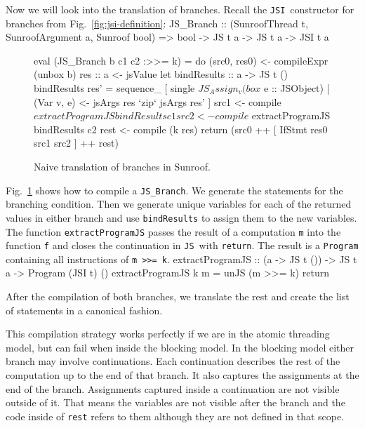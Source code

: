 \documentclass{llncs}
\newcommand{\Src}[1]{{\tt{#1}}}
\newcommand{\JS}{\Src{JS}}
\newcommand{\JSI}{\Src{JSI}}
\newenvironment{Code}{\verbatim}{\endverbatim}
\newcommand{\FigRef}[1]{Fig.~\ref{#1}}
\begin{document}
Now we will look into the translation of branches.
Recall the \JSI~constructor for branches from \FigRef{fig:jsi-definition}:
\begin{Code}
JS_Branch :: (SunroofThread t, SunroofArgument a, Sunroof bool) 
          => bool -> JS t a -> JS t a  -> JSI t a
\end{Code}
\begin{figure}[t]
\begin{Code}
eval (JS_Branch b c1 c2 :>>= k) = do
  (src0, res0) <- compileExpr (unbox b)
  res :: a <- jsValue
  let bindResults :: a -> JS t ()
      bindResults res' =
        sequence_ [ single $ JS_Assign_ v (box $ e :: JSObject)
                  | (Var v, e) <- jsArgs res `zip` jsArgs res' ]
  src1 <- compile $ extractProgramJS bindResults c1
  src2 <- compile $ extractProgramJS bindResults c2
  rest <- compile (k res)
  return (src0 ++ [ IfStmt res0 src1 src2 ] ++ rest)
\end{Code}
\caption{Naive translation of branches in Sunroof.}
\label{fig:branch-translation}
\end{figure}
\FigRef{fig:branch-translation} shows how to compile a \Src{JS\_Branch}.
We generate the statements for the branching condition.
Then we generate unique variables for each of the returned values in 
either branch and use \Src{bindResults} to assign them to the 
new variables. The function \Src{extractProgramJS} 
passes the result of a computation \Src{m} 
into the function \Src{f} and
closes the continuation in \JS~with \Src{return}.
The result is a \Src{Program} containing
all instructions of \Src{m >>= k}.
\begin{Code}
extractProgramJS :: (a -> JS t ()) -> JS t a -> Program (JSI t) ()
extractProgramJS k m = unJS (m >>= k) return
\end{Code}

After the compilation of both branches, we translate the 
rest and create the list of statements in a canonical fashion.

This compilation strategy works perfectly if we are in the atomic threading model,
but can fail when inside the blocking model. 
In the blocking model either branch 
may involve continuations. Each 
continuation describes the rest of the computation up
to the end of that branch. It also captures the 
assignments at the end of the branch. 
Assignments captured inside a continuation
are not visible outside of 
it. That means the variables are not visible 
after the branch and the code inside of \Src{rest} refers to them
although they are not defined in that scope.
\end{document}
